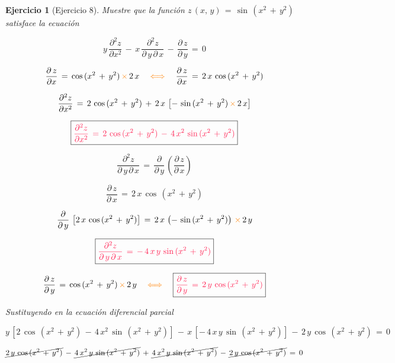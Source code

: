\documentclass[a4paper,11pt,openany]{book}
\newtheorem{ejer}{Ejercicio}[section]
\begin{document}
\begin{ejer}[Ejercicio 8] 

  Muestre que la función $z\,(x,\,y)\,=\,\sin\,(x^{2}\,+\,y^{2})$ satisface la ecuación 

$$y\,\dfrac{\partial^2{z}}{\partial{x}^{2}}\,-\,x\,\dfrac{\partial^2{z}}{\partial\,y\,\partial\,x}\,-\,\dfrac{\partial\,z}{\partial\,y}\,=\,0$$ 

$$\dfrac{\partial\,z}{\partial{x}}\,=\,\cos\,(x^{2}\,+\,y^{2})\,\textcolor{orange}{\times}\,2\,x \quad \textcolor{orange}{\iff} \quad \dfrac{\partial\,z}{\partial{x}}\,=\,2\,x\,\cos\,(x^{2}\,+\,y^{2})$$ 

$$\dfrac{\partial^2{z}}{\partial{x}^{2}}\,=\,2\,\cos\,(x^{2}\,+\,y^{2})\,+\,2\,x\,\left[-\,\sin\,(x^{2}\,+\,y^{2})\,\textcolor{orange}{\times}\,2\,x \right]$$ 


$$\boxed{\textcolor{awesome}{\dfrac{\partial^2{z}}{\partial{x}^{2}}\,=\,2\,\cos\,(x^{2}\,+\,y^{2})\,-\,4\,x^{2}\,\sin\,(x^{2}\,+\,y^{2})}}$$ 

$$\dfrac{\partial^2{z}}{\partial\,y\,\partial\,x}\,=\,\dfrac{\partial}{\partial\,y}\,\left(\dfrac{\partial\,z}{\partial\,x} \right)$$ 

$$\dfrac{\partial\,z}{\partial\,x}\,=\,2\,x\,\cos\,(x^{2}\,+\,y^{2})$$ 

$$\dfrac{\partial}{\partial\,y}\,\left[2\,x\,\cos\,(x^{2}\,+\,y^{2}) \right]\,=\,2\,x\,\left(-\,\sin\,(x^{2}\,+\,y^{2}) \right)\,\textcolor{orange}{\times}\,2\,y$$ 

$$\boxed{\textcolor{awesome}{\dfrac{\partial^2{z}}{\partial\,y\,\partial\,x}\,=\,-\,4\,x\,y\,\sin\,(x^{2}\,+\,y^{2}) } } $$ 

$$\dfrac{\partial\,z}{\partial\,y}\,=\,\cos\,(x^{2}\,+\,y^{2})\,\textcolor{orange}{\times}\,2\,y \quad \textcolor{orange}{\iff} \quad \boxed{\textcolor{awesome}{\dfrac{\partial\,z}{\partial\,y}\,=\,2\,y\,\cos\,(x^{2}\,+\,y^{2}) } }$$ 

Sustituyendo en la ecuación diferencial parcial  

$$y\,\left[2\,\cos\,(x^{2}\,+\,y^{2})\,-\,4\,x^{2}\,\sin\,(x^{2}\,+\,y^{2}) \right]\,-\,x\,\left[-\,4\,x\,y\,\sin\,(x^{2}\,+\,y^{2}) \right]\,-\,2\,y\,\cos\,(x^{2}\,+\,y^{2})\,=\,0 $$ 

$$\cancel{2\,y\,\cos\,(x^{2}\,+\,y^{2})}\,-\,\cancel{4\,x^{2}\,y\,\sin\,(x^{2}\,+\,y^{2})}\,+\,\cancel{4\,x^{2}\,y\,\sin\,(x^{2}\,+\,y^{2})}\,-\,\cancel{2\,y\,\cos\,(x^{2}\,+\,y^{2})}\,=\,0$$ 

\begin{center} 


\end{center} 

\end{ejer} 
\end{document}
